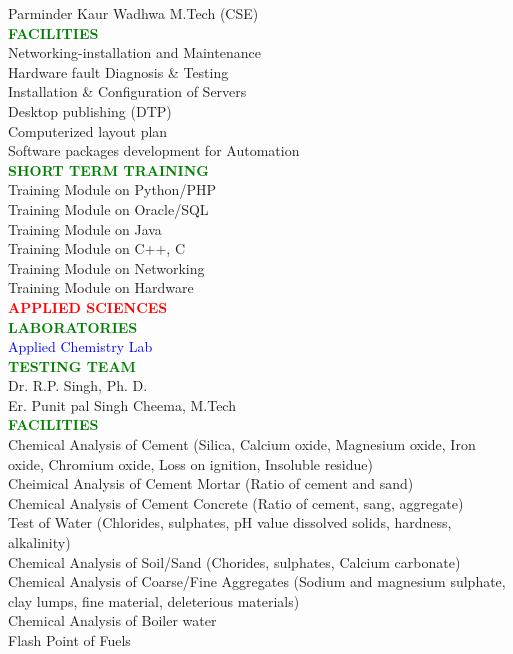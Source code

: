 Parminder Kaur Wadhwa M.Tech (CSE)\\
\textcolor{green}{\bf FACILITIES}\\
Networking-installation and Maintenance\\
Hardware fault Diagnosis & Testing \\
Installation & Configuration of Servers \\
Desktop publishing (DTP) \\
Computerized layout plan \\
Software packages development for Automation\\
\textcolor{green}{\bf SHORT TERM TRAINING}\\
Training Module on Python/PHP\\
Training Module on Oracle/SQL \\
Training Module on Java \\
Training Module on C++, C \\
Training Module on Networking \\
Training Module on Hardware \\
\textcolor{red}{\bf{\Large APPLIED SCIENCES}}\\
\textcolor{green}{\bf \large LABORATORIES}\\
\textcolor{blue}{Applied Chemistry Lab}\\
\textcolor{green}{\bf\large TESTING TEAM}\\
Dr. R.P. Singh, Ph. D.\\
Er. Punit pal Singh Cheema, M.Tech\\
\textcolor{green}{\bf FACILITIES}\\
 Chemical Analysis of Cement (Silica, Calcium oxide, Magnesium oxide, Iron oxide, Chromium oxide, Loss on ignition, Insoluble residue) \\
Cheimical Analysis of Cement Mortar (Ratio of cement and sand)\\
Chemical Analysis of Cement Concrete (Ratio of cement, sang, aggregate)\\
Test of Water (Chlorides, sulphates, pH value dissolved  solids, hardness, alkalinity) \\
Chemical Analysis of Soil/Sand (Chorides,  sulphates, Calcium carbonate) \\
Chemical Analysis of Coarse/Fine  Aggregates (Sodium and magnesium sulphate, clay lumps, fine material, deleterious materials) \\
Chemical Analysis of Boiler water \\
Flash Point of Fuels  \\
